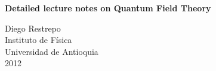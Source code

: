 \documentclass[12pt,letterpaper]{book}
\theoremstyle{example}
\newcommand{\tofc}[1]{#1} %
\begin{document}
\renewcommand{\thepage}{\roman{page}}
\begin{titlepage}
  \begin{center}

    
\textbf{\huge    Detailed lecture notes on Quantum Field Theory}

    

\vspace{4cm}
 Diego Restrepo\\
Instituto de Física\\
Universidad de Antioquia\\
2012
    
  \end{center}
\end{titlepage}





\tofc{
\renewcommand{\thepage}{\roman{page}}
\tableofcontents{}

\newpage{}
}

\renewcommand{\thepage}{\arabic{page}}
\setcounter{page}{1}











% 
% 
% 
% 
% 
% 

\end{document}
